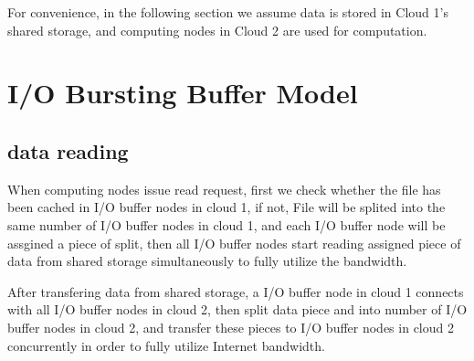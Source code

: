 \documentclass[JIP,draft]{ipsj}
\begin{document}
For convenience, in the following section we assume data is stored in Cloud 1's shared storage, and computing nodes in Cloud 2 are used for computation. 

\section{I/O Bursting Buffer Model}

\subsection{data reading}
When computing nodes issue read request, first we check whether the file has been cached in I/O buffer nodes in cloud 1, if not, File will be splited into the same number of I/O buffer nodes in cloud 1, and each I/O buffer node will be assgined a piece of split, then all I/O buffer nodes start reading assigned piece of data from shared storage simultaneously to fully utilize the bandwidth.

After transfering data from shared storage, a I/O buffer node in cloud 1 connects with all I/O buffer nodes in cloud 2, then split data piece and into number of I/O buffer nodes in cloud 2, and transfer these pieces to I/O buffer nodes in cloud 2 concurrently in order to fully utilize Internet bandwidth.
\end{document}
